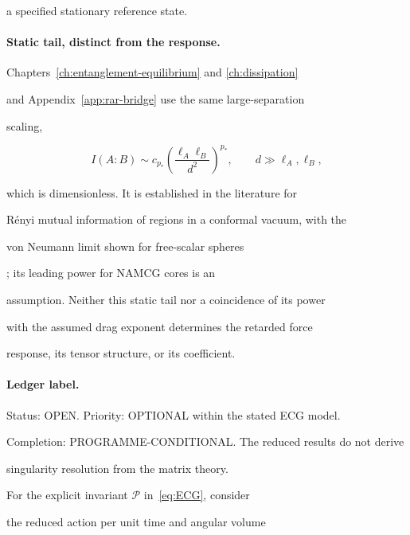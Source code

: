 a specified stationary reference state.





\paragraph{Static tail, distinct from the response.} \label{detail:sec-H-paragraphstatictaildistinctfro-42}

Chapters~\ref{ch:entanglement-equilibrium} and \ref{ch:dissipation}

and Appendix~\ref{app:rar-bridge} use the same large-separation

scaling,

\[

I(A:B)\sim c_{p_*}

\left(\frac{\ell_A\ell_B}{d^2}\right)^{p_*},

\qquad d\gg\ell_A,\ell_B,

\]

which is dimensionless. It is established in the literature for

R\'enyi mutual information of regions in a conformal vacuum, with the

von Neumann limit shown for free-scalar spheres

\cite{Cardy2013MI}; its leading power for NAMCG cores is an

assumption. Neither this static tail nor a coincidence of its power

with the assumed drag exponent determines the retarded force

response, its tensor structure, or its coefficient.





\paragraph{Ledger label.} \label{detail:sec-H-paragraphledgerlabel-43}

Status: OPEN. Priority: OPTIONAL within the stated ECG model.

Completion: PROGRAMME-CONDITIONAL. The reduced results do not derive

singularity resolution from the matrix theory.



For the explicit invariant \(\mathcal P\) in~\eqref{eq:ECG}, consider

the reduced action per unit time and angular volume

